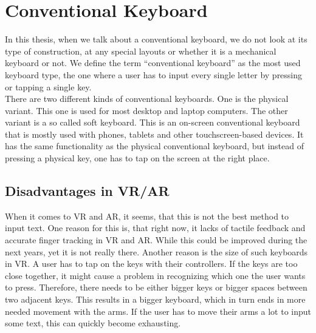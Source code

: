 \section{Conventional Keyboard}
In this thesis, when we talk about a conventional keyboard, we do not look at its type of construction, at any special layouts or whether it is a mechanical keyboard or not. We define the term ``conventional keyboard'' as the most used keyboard type, the one where a user has to input every single letter by pressing or tapping a single key.\\
There are two different kinds of conventional keyboards. One is the physical variant. This one is used for most desktop and laptop computers. The other variant is a so called soft keyboard. This is an on-screen conventional keyboard that is mostly used with phones, tablets and other touchscreen-based devices. It has the same functionality as the physical conventional keyboard, but instead of pressing a physical key, one has to tap on the screen at the right place.\\

\subsection{Disadvantages in VR/AR}
When it comes to VR and AR, it seems, that this is not the best method to input text. One reason for this is, that right now, it lacks of tactile feedback and accurate finger tracking in VR and AR. While this could be improved during the next years, yet it is not really there. Another reason is the size of such keyboards in VR. A user has to tap on the keys with their controllers. If the keys are too close together, it might cause a problem in recognizing which one the user wants to press. Therefore, there needs to be either bigger keys or bigger spaces between two adjacent keys. This results in a bigger keyboard, which in turn ends in more needed movement with the arms. If the user has to move their arms a lot to input some text, this can quickly become exhausting.

